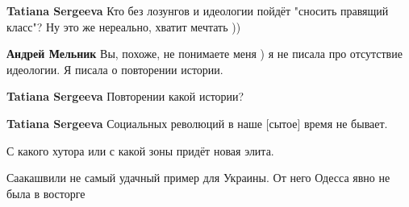\begin{itemize}
\begin{itemize}
\textbf{Tatiana Sergeeva} Кто без лозунгов и идеологии пойдёт "сносить правящий класс"? Ну это же нереально, хватит мечтать ))

 
\textbf{Андрей Мельник} Вы, похоже, не понимаете меня ) я не писала про отсутствие идеологии. Я писала о повторении истории.

 
\textbf{Tatiana Sergeeva} Повторении какой истории?

 
\textbf{Tatiana Sergeeva} Социальных революций в наше [сытое] время не бывает.
\end{itemize}

 
С какого хутора или с какой зоны придёт новая элита.

 
Саакашвили не самый удачный пример для Украины. От него Одесса явно не была в восторге

\begin{itemize}
 

\end{itemize}
\end{itemize}
